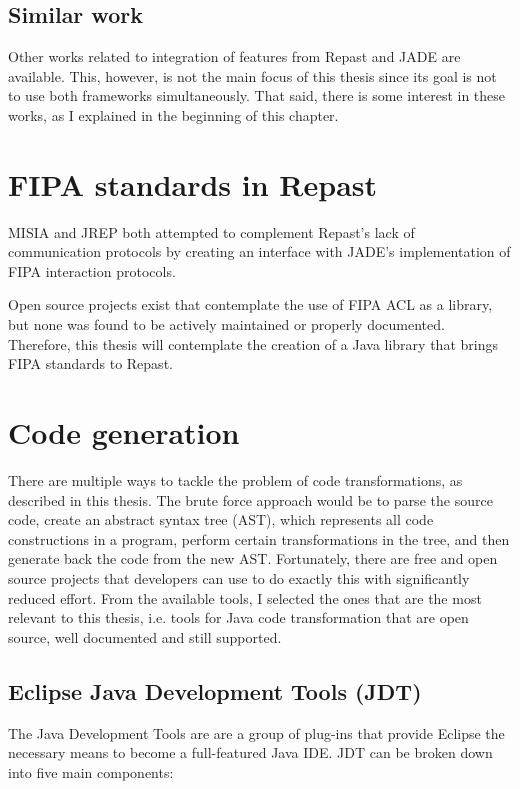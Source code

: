\subsection{Similar work}
	Other works related to integration of features from Repast and JADE are available. This, however, is not the main focus of this thesis since its goal is not to use both frameworks simultaneously. That said, there is some interest in these works, as I explained in the beginning of this chapter. 


\section{FIPA standards in Repast}
	MISIA and JREP both attempted to complement Repast's lack of communication protocols by creating an interface with JADE's implementation of FIPA interaction protocols. 

	Open source projects exist that contemplate the use of FIPA ACL as a library, but none was found to be actively maintained or properly documented. Therefore, this thesis will contemplate the creation of a Java library that brings FIPA standards to Repast.


\section{Code generation}
	There are multiple ways to tackle the problem of code transformations, as described in this thesis. The brute force approach would be to parse the source code, create an abstract syntax tree (AST), which represents all code constructions in a program, perform certain transformations in the tree, and then generate back the code from the new AST. Fortunately, there are free and open source projects that developers can use to do exactly this with significantly reduced effort. From the available tools, I selected the ones that are the most relevant to this thesis, i.e. tools for Java code transformation that are open source, well documented and still supported. 

\subsection{Eclipse Java Development Tools (JDT)}


	The Java Development Tools are are a group of plug-ins that provide Eclipse the necessary means to become a full-featured Java IDE. JDT can be broken down into five main components: 

